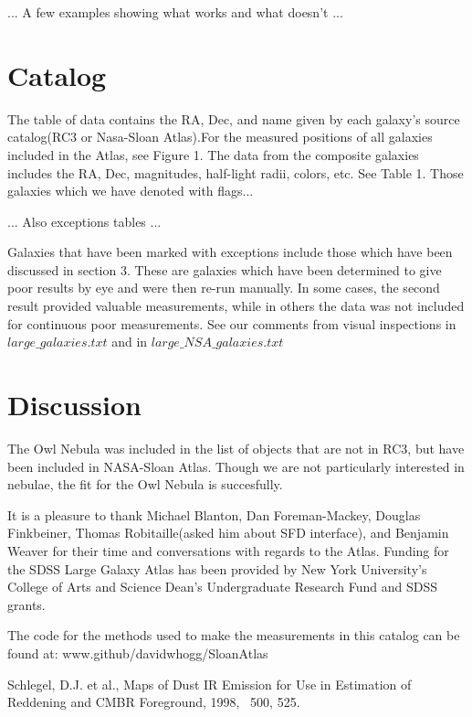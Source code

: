 \documentclass[12pt,preprint,pdftex]{aastex}
\begin{document}
... A few examples showing what works and what doesn't ...

\section{Catalog}
The table of data contains the RA, Dec, and name given by each galaxy's source catalog(RC3 or Nasa-Sloan Atlas).For the measured positions of all galaxies included in the Atlas, see Figure 1. The data from the composite galaxies includes the RA, Dec, magnitudes, half-light radii, colors, etc. See Table 1. Those galaxies which we have denoted with flags... 

... Also exceptions tables ...

Galaxies that have been marked with exceptions include those which have been discussed in section 3. These are galaxies which have been determined to give poor results by eye and were then re-run manually. In some cases, the second result provided valuable measurements, while in others the data was not included for continuous poor measurements. See our comments from visual inspections in $large\_galaxies.txt$ and in $large\_NSA\_galaxies.txt$

\section{Discussion}

The Owl Nebula was included in the list of objects that are not in RC3, but have been included in NASA-Sloan Atlas. Though we are not particularly interested in nebulae, the fit for the Owl Nebula is succesfully.

\acknowledgements

It is a pleasure to thank Michael Blanton, Dan Foreman-Mackey, Douglas Finkbeiner, Thomas Robitaille(asked him about SFD interface), and Benjamin Weaver for their time and conversations with regards to the Atlas. Funding for the SDSS Large Galaxy Atlas has been provided by New York University's College of Arts and Science Dean's Undergraduate Research Fund and  SDSS grants.

The code for the methods used to make the measurements in this catalog can be found at: www.github/davidwhogg/SloanAtlas

\begin{thebibliography}{}
 {Schlegel, D.J. et al., Maps of Dust IR Emission for Use in Estimation of Reddening and CMBR Foreground, 1998, \apj~500, 525.}
\end{thebibliography}
\clearpage
\end{document}
